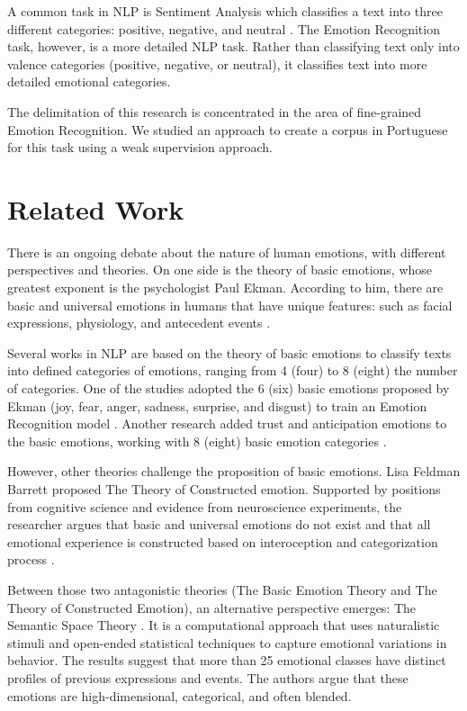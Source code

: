 \documentclass[12pt]{article}
\begin{document}
A common task in NLP is Sentiment Analysis which classifies a text into three different categories: positive, negative, and neutral \cite{Drus2019}. The Emotion Recognition task, however, is a more detailed NLP task. Rather than classifying text only into valence categories (positive, negative, or neutral), it classifies text into more detailed emotional categories.

The delimitation of this research is concentrated in the area of fine-grained Emotion Recognition. We studied an approach to create a corpus in Portuguese for this task using a weak supervision approach. 

\section{Related Work}
\label{sec:related-work}

There is an ongoing debate about the nature of human emotions, with different perspectives and theories. On one side is the theory of basic emotions, whose greatest exponent is the psychologist Paul Ekman. According to him, there are basic and universal emotions in humans that have unique features: such as facial expressions, physiology, and antecedent events \cite{Ekman1992}.

Several works in NLP are based on the theory of basic emotions to classify texts into defined categories of emotions, ranging from 4 (four) to 8 (eight) the number of categories. One of the studies adopted the 6 (six) basic emotions proposed by Ekman (joy, fear, anger, sadness, surprise, and disgust) to train an Emotion Recognition model \cite{Batbaatar2019}. Another research added trust and anticipation emotions to the basic emotions, working with 8 (eight) basic emotion categories \cite{Sosea2020}.

However, other theories challenge the proposition of basic emotions. Lisa Feldman Barrett proposed The Theory of Constructed emotion. Supported by positions from cognitive science and evidence from neuroscience experiments, the researcher argues that basic and universal emotions do not exist and that all emotional experience is constructed based on interoception and categorization process \cite{Barrett2016}.

Between those two antagonistic theories (The Basic Emotion Theory and The Theory of Constructed Emotion), an alternative perspective emerges: The Semantic Space Theory \cite{Cowen2021}. It is a computational approach that uses naturalistic stimuli and open-ended statistical techniques to capture emotional variations in behavior. The results suggest that more than 25 emotional classes have distinct profiles of previous expressions and events. The authors argue that these emotions are high-dimensional, categorical, and often blended.
\end{document}
